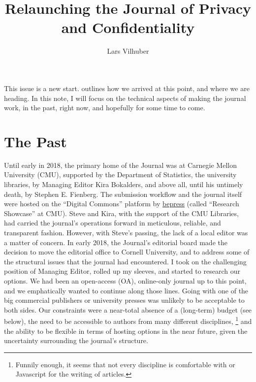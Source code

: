 \documentclass{jpcfinal} %
\begin{document}
\title[Relaunching JPC]{Relaunching the Journal of Privacy and Confidentiality}

\author{Lars Vilhuber}	%
\address{Managing Editor, Journal of Privacy and Confidentiality\newline 
Department of Economics, Cornell University}	%

\maketitle

This issue is a new start. \cite{DworkEditorial} outlines how we arrived at this point, and where we are heading. In this note, I will focus on the technical aspects of making the journal work, in the past, right  now, and hopefully for some time to come. 
\section{The Past}

Until early in 2018, the primary home of the Journal was at Carnegie Mellon University (CMU), supported by the Department of Statistics, the university libraries, by  Managing Editor Kira Bokalders, and above all, until his untimely death,  by Stephen E. Fienberg. The submission workflow and the journal itself were hosted on the ``Digital Commons'' platform by \href{https://www.bepress.com}{bepress} (called ``Research Showcase'' at CMU). Steve and Kira, with the support of the CMU Libraries, had carried the journal's operations forward in meticulous, reliable, and transparent fashion. However, with Steve's passing, the lack of a local editor was a matter of concern. In early 2018, the Journal's editorial board made the decision to move the editorial office to Cornell University, and to address some of the structural issues that the journal had encountered. I took on the challenging position of Managing Editor, rolled up my sleeves, and started to research our options. We had been an open-access (OA), online-only journal up to this point, and we emphatically wanted to continue along those lines. Going with one of the big commercial publishers or university presses was unlikely to be acceptable to both sides.  Our constraints were a near-total absence of a (long-term) budget (see below),  the need to be accessible to authors from many different disciplines,%
\footnote{Funnily enough, it seems that   not every discipline is comfortable with \LaTe{} or Javascript for the writing of articles.}
and the ability to be flexible in terms of hosting options in the near future, given the uncertainty surrounding the journal's structure.
\end{document}
